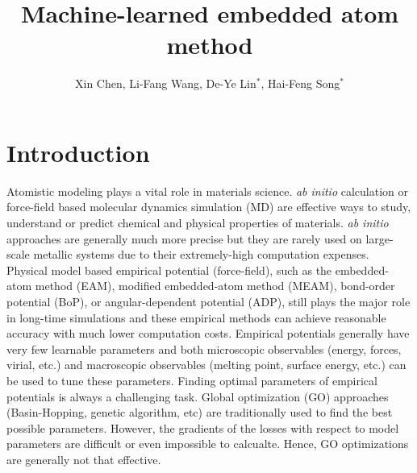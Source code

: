 \documentclass[prb,reprint]{revtex4-2}
\begin{document}
\title{
    Machine-learned embedded atom method
}

\author{Xin Chen, 
        Li-Fang Wang, 
        De-Ye Lin$^\mathrm{*}$, 
        Hai-Feng Song$^\mathrm{*}$}



% 
%
\begin{abstract}
\end{abstract}

\maketitle

% 
%
\section{Introduction}
\label{sec:introduction}

Atomistic modeling plays a vital role in materials science. \textit{ab initio} 
calculation or force-field based molecular dynamics simulation (MD) are 
effective ways to study, understand or predict chemical and physical properties 
of materials. \textit{ab initio} approaches are generally much more precise but 
they are rarely used on large-scale metallic systems due to their extremely-high 
computation expenses. Physical model based empirical potential (force-field), 
such as the embedded-atom method (EAM), modified embedded-atom method (MEAM), 
bond-order potential (BoP), or angular-dependent potential (ADP), still plays 
the major role in long-time simulations and these empirical methods can achieve 
reasonable accuracy with much lower computation costs. Empirical potentials 
generally have very few learnable parameters and both microscopic observables 
(energy, forces, virial, etc.) and macroscopic observables (melting 
point, surface energy, etc.) can be used to tune these parameters. Finding 
optimal parameters of empirical potentials is always a challenging task. Global 
optimization (GO) approaches (Basin-Hopping, genetic algorithm, etc) are 
traditionally used to find the best possible parameters. However, the gradients 
of the losses with respect to model parameters are difficult or even impossible 
to calcualte. Hence, GO optimizations are generally not that effective.
\end{document}
